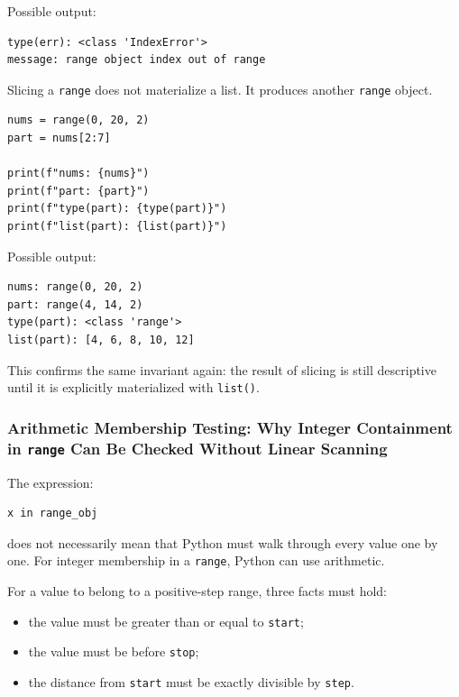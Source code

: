 Possible output:

\begin{verbatim}
type(err): <class 'IndexError'>
message: range object index out of range
\end{verbatim}

Slicing a \texttt{range} does not materialize a list. It produces another \texttt{range} object.

\begin{verbatim}
nums = range(0, 20, 2)
part = nums[2:7]

print(f"nums: {nums}")
print(f"part: {part}")
print(f"type(part): {type(part)}")
print(f"list(part): {list(part)}")
\end{verbatim}

Possible output:

\begin{verbatim}
nums: range(0, 20, 2)
part: range(4, 14, 2)
type(part): <class 'range'>
list(part): [4, 6, 8, 10, 12]
\end{verbatim}

This confirms the same invariant again: the result of slicing is still descriptive until it is explicitly materialized with \texttt{list()}.

\subsubsection{Arithmetic Membership Testing: Why Integer Containment in \texttt{range} Can Be Checked Without Linear Scanning}

The expression:

\begin{verbatim}
x in range_obj
\end{verbatim}

does not necessarily mean that Python must walk through every value one by one. For integer membership in a \texttt{range}, Python can use arithmetic.

For a value to belong to a positive-step range, three facts must hold:

\begin{itemize}
    \item the value must be greater than or equal to \texttt{start};
    \item the value must be before \texttt{stop};
    \item the distance from \texttt{start} must be exactly divisible by \texttt{step}.
\end{itemize}

